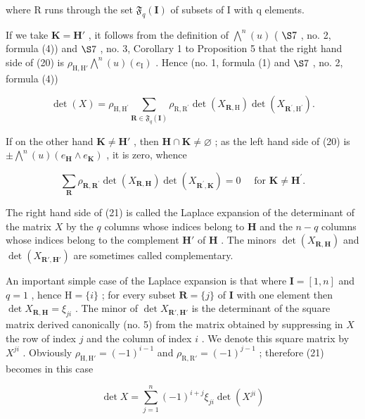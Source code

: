 where R runs through the set \(\mathfrak{F}_{q}(\mathbf{I})\) of subsets of I with q elements.

If we take \(\mathbf{K} = \mathbf{H}'\) , it follows from the definition of \(\bigwedge^{n}(u)\) ( \(\S 7\) , no. 2, formula (4)) and \(\S 7\) , no. 3, Corollary 1 to Proposition 5 that the right hand side of (20) is \(\rho_{\mathrm{H},\mathrm{H}'}\bigwedge^{n}(u)(e_{\mathrm{I}})\) . Hence (no. 1, formula (1) and \(\S 7\) , no. 2, formula (4))

\[
\det (X) = \rho_ {\mathrm{H}, \mathrm{H} ^ {\prime}} \sum_ {\mathbf {R} \in \mathfrak {F} _ {q} (\mathbf {I})} \rho_ {\mathrm{R}, \mathrm{R} ^ {\prime}} \det (X _ {\mathbf {R}, \mathrm{H}}) \det (X _ {\mathbf {R} ^ {\prime}, \mathrm{H} ^ {\prime}}).\tag{21}
\]

If on the other hand \(\mathbf{K} \neq \mathbf{H}'\) , then \(\mathbf{H} \cap \mathbf{K} \neq \varnothing\) ; as the left hand side of (20) is \(\pm \bigwedge^{n}(u)(e_{\mathbf{H}} \wedge e_{\mathbf{K}})\) , it is zero, whence

\[
\sum_ {\mathbf {R}} \rho_ {\mathbf {R}, \mathbf {R} ^ {\prime}} \det (X _ {\mathbf {R}, \mathbf {H}}) \det (X _ {\mathbf {R} ^ {\prime}, \mathbf {K}}) = 0 \quad \text { for } \mathbf {K} \neq \mathbf {H} ^ {\prime}.\tag{22}
\]

The right hand side of (21) is called the Laplace expansion of the determinant of the matrix \(X\) by the \(q\) columns whose indices belong to \(\mathbf{H}\) and the \(n - q\) columns whose indices belong to the complement \(\mathbf{H}'\) of \(\mathbf{H}\) . The minors \(\det(X_{\mathbf{R},\mathbf{H}})\) and \(\det(X_{\mathbf{R}',\mathbf{H}'})\) are sometimes called complementary.

An important simple case of the Laplace expansion is that where \(\mathbf{I} = [1, n]\) and \(q = 1\) , hence \(\mathrm{H} = \{i\}\) ; for every subset \(\mathbf{R} = \{j\}\) of \(\mathbf{I}\) with one element then \(\det X_{\mathbf{R},\mathbf{H}} = \xi_{ji}\) . The minor of \(\det X_{\mathbf{R}',\mathbf{H}'}\) is the determinant of the square matrix derived canonically (no. 5) from the matrix obtained by suppressing in \(X\) the row of index \(j\) and the column of index \(i\) . We denote this square matrix by \(X^{ji}\) . Obviously \(\rho_{\mathrm{H},\mathrm{H}'} = (-1)^{i-1}\) and \(\rho_{\mathrm{R},\mathrm{R}'} = (-1)^{j-1}\) ; therefore (21) becomes in this case

\[
\det X = \sum_ {j = 1} ^ {n} (- 1) ^ {i + j} \xi_ {j i} \det (X ^ {j i})\tag{23}
\]

